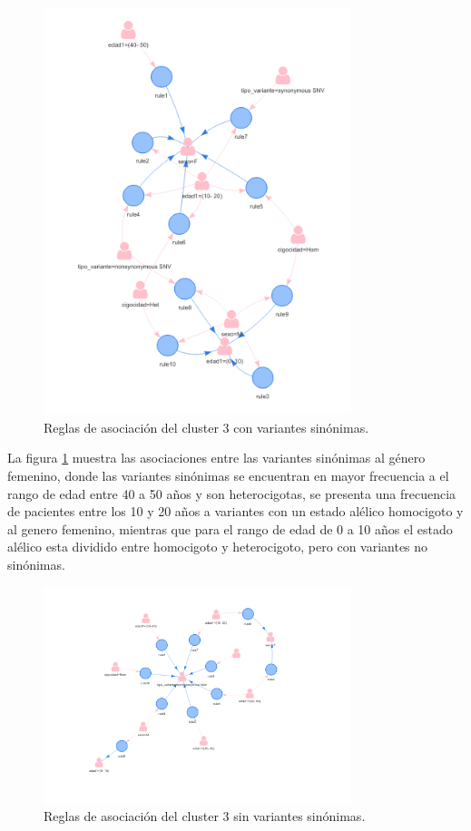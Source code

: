 \begin{figure}[H]
	\centering
	\includegraphics[width=0.8\textwidth]{Kap4/reglas3_1}
	\caption{Reglas de asociación del cluster 3 con variantes sinónimas.} \label{fig:r3}
\end{figure}

La figura \ref{fig:r3} muestra las asociaciones entre las variantes sinónimas al género femenino, donde las variantes sinónimas se encuentran en mayor frecuencia a el rango de edad entre 40 a 50 años y son heterocigotas, se presenta una frecuencia de pacientes entre los 10 y 20 años a variantes con un estado alélico homocigoto y al genero femenino, mientras que para el rango de edad de 0 a 10 años el estado alélico esta dividido entre homocigoto y heterocigoto, pero con variantes no sinónimas.

\begin{figure}[H]
	\centering
	\includegraphics[width=0.8\textwidth]{Kap4/reglas3_2}
	\caption{Reglas de asociación del cluster 3 sin variantes sinónimas.} \label{fig:re3}
\end{figure}

